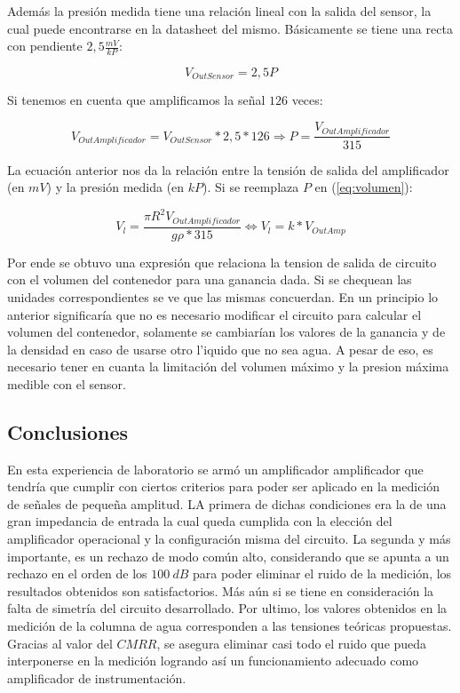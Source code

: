 Adem\'as la presión medida tiene una relación lineal con la salida del sensor, la cual puede encontrarse en la datasheet del mismo. Básicamente se tiene una recta con pendiente $2,5\frac{mV}{kP}$:

\begin{equation}
V_{OutSensor} = 2,5P
\end{equation}

Si tenemos en cuenta que amplificamos la señal $126$ veces:

\begin{equation}
V_{OutAmplificador} = V_{OutSensor}*2,5*126 \Longrightarrow P = \frac{V_{OutAmplificador}}{315}
\end{equation}

La ecuación anterior nos da la relación entre la tensión de salida del amplificador (en $mV$) y la presión medida (en $kP$). Si se reemplaza $P$ en (\ref{eq:volumen}):

\begin{equation}
V_l = \frac{\pi R^2V_{OutAmplificador}}{g\rho*315} \Longleftrightarrow V_l = k*V_{OutAmp}
\end{equation} 

Por ende se obtuvo una expresión que relaciona la tension de salida de circuito con el volumen del contenedor para una ganancia dada. Si se chequean las unidades correspondientes se ve que las mismas concuerdan. En un principio lo anterior significar\'ia que no es necesario modificar el circuito para calcular el volumen del contenedor, solamente se cambiar\'ian los valores de la ganancia y de la densidad en caso de usarse otro l'iquido que no sea agua. A pesar de eso, es necesario tener en cuanta la limitaci\'on del volumen m\'aximo y la presion m\'axima medible con el sensor.


\subsection{Conclusiones}

En esta experiencia de laboratorio se arm\'o un amplificador amplificador que tendr\'ia que cumplir con ciertos criterios para poder ser aplicado en la medici\'on de señales de pequeña amplitud. LA primera de dichas condiciones era la de una gran impedancia de entrada la cual queda cumplida con la elección del amplificador operacional y la configuración misma del circuito. La segunda y m\'as importante, es un rechazo de modo com\'un alto, considerando que se apunta a un rechazo en el orden de los $100 \ dB$ para poder eliminar el ruido de la medición, los resultados obtenidos son satisfactorios. M\'as a\'un si se tiene en consideración la falta de simetría del circuito desarrollado. Por ultimo, los valores obtenidos en la medición de la columna de agua corresponden a las tensiones teóricas propuestas. Gracias al valor del $CMRR$, se asegura eliminar casi todo el ruido que pueda interponerse en la medición logrando así un funcionamiento adecuado como amplificador de instrumentación.
